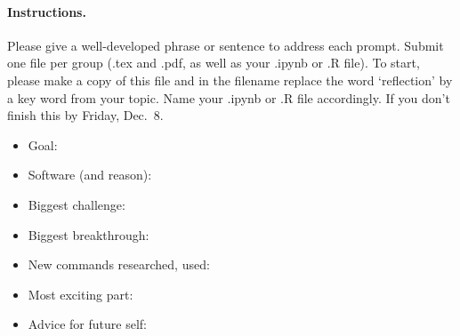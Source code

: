 \documentclass[12pt]{article}
\begin{document}
\pagestyle{fancy}
\paragraph{Instructions.} Please give a well-developed phrase or sentence to address each prompt.  Submit one file per group (\textsf{.tex} and \textsf{.pdf}, as well as your \textsf{.ipynb} or \textsf{.R} file). To start, please make a copy of this file and in the filename replace the word `reflection' by a key word from  your topic.  Name your \textsf{.ipynb} or \textsf{.R} file accordingly.  If you don't finish this by Friday, Dec.~8.

\begin{itemize}
\item Goal: 

\item Software (and reason): 

\item Biggest challenge:

\item Biggest breakthrough:

\item New commands researched, used:

\item Most exciting part:

\item Advice for future self:

\end{itemize}
\end{document}
